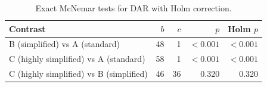 \begin{table}[H]
\caption{Exact McNemar tests for DAR with Holm correction.}
\label{tab:da:pairwise}
\centering
\begin{tabular}{lrrrr}
\toprule
Contrast & $b$ & $c$ & $p$ & Holm $p$ \\
\midrule
B (simplified) vs A (standard) & 48 & 1 & $<0.001$ & $<0.001$ \\
C (highly simplified) vs A (standard) & 58 & 1 & $<0.001$ & $<0.001$ \\
C (highly simplified) vs B (simplified) & 46 & 36 & 0.320 & 0.320 \\
\bottomrule
\end{tabular}
\end{table}
